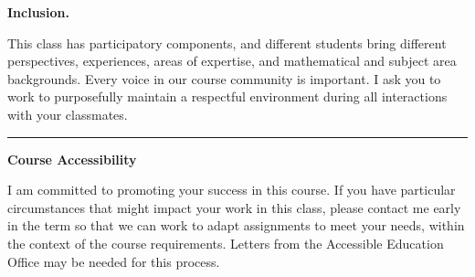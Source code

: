 \documentclass[12pt,letterpaper]{exam}
\begin{document}
\noindent\textbf{Inclusion.}

This class has participatory components, and different students bring different perspectives, experiences, areas of expertise, and mathematical and subject area backgrounds.  Every voice in our course community is important.  I ask you to work to purposefully maintain a respectful environment during all interactions with your classmates.


\vspace{0.5cm}
\hrule
\vspace{0.5cm}

\noindent\textbf{Course Accessibility}

I am committed to promoting your success in this course.  If you have particular circumstances that might impact your work in this class, please contact me early in the term so that we can work to adapt assignments to meet your needs, within the context of the course requirements.  Letters from the Accessible Education Office may be needed for this process.





\end{document}
